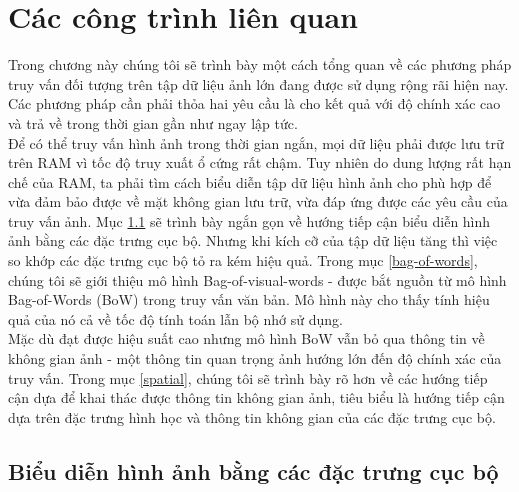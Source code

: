 \chapter{Các công trình liên quan}
\ifpdf
    \graphicspath{{Chapter2/Chapter2Figs/PNG/}{Chapter2/Chapter2Figs/PDF/}{Chapter2/Chapter2Figs/}}
\else
    \graphicspath{{Chapter2/Chapter2Figs/EPS/}{Chapter2/Chapter2Figs/}}
\fi


Trong chương này chúng tôi sẽ trình bày một cách tổng quan về các phương pháp truy vấn đối tượng trên tập dữ liệu ảnh lớn đang được sử dụng rộng rãi hiện nay. Các phương pháp cần phải thỏa hai yêu cầu là cho kết quả với độ chính xác cao và trả về trong thời gian gần như ngay lập tức.\\
Để có thể truy vấn hình ảnh trong thời gian ngắn, mọi dữ liệu phải được lưu trữ trên RAM vì tốc độ truy xuất ổ cứng rất chậm. Tuy nhiên do dung lượng rất hạn chế của RAM, ta phải tìm cách biểu diễn tập dữ liệu hình ảnh cho phù hợp để vừa đảm bảo được về mặt không gian lưu trữ, vừa đáp ứng được các yêu cầu của truy vấn ảnh. Mục \ref{local-features} sẽ trình bày ngắn gọn về hướng tiếp cận biểu diễn hình ảnh bằng các đặc trưng cục bộ. Nhưng khi kích cỡ của tập dữ liệu tăng thì việc so khớp các đặc trưng cục bộ tỏ ra kém hiệu quả. Trong mục \ref{bag-of-words}, chúng tôi sẽ giới thiệu mô hình Bag-of-visual-words -  được bắt nguồn từ mô hình Bag-of-Words (BoW) trong truy vấn văn bản. Mô hình này cho thấy tính hiệu quả của nó cả về tốc độ tính toán lẫn bộ nhớ sử dụng.\\
Mặc dù đạt được hiệu suất cao nhưng mô hình BoW vẫn bỏ qua thông tin về không gian ảnh - một thông tin quan trọng ảnh hướng lớn đến độ chính xác của truy vấn. Trong mục \ref{spatial}, chúng tôi sẽ trình bày rõ hơn về các hướng tiếp cận dựa để khai thác được thông tin không gian ảnh, tiêu biểu là hướng tiếp cận dựa trên đặc trưng hình học và thông tin không gian của các đặc trưng cục bộ.\\


\section{Biểu diễn hình ảnh bằng các đặc trưng cục bộ}
\label{local-features}

